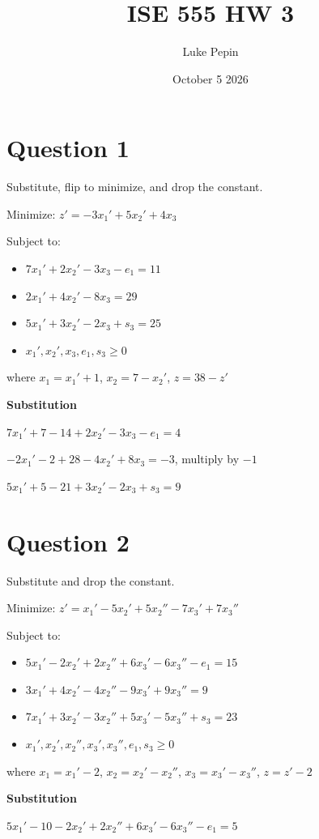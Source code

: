 \documentclass{article}
\title{ISE 555 HW 3}
\author{Luke Pepin}
\date{October 5 2026}
\begin{document}
\maketitle

\section*{Question 1}
Substitute, flip to minimize, and drop the constant.

Minimize: $z' = -3x_1' + 5x_2' + 4x_3$

Subject to:
\begin{itemize}
    \item $7x_1' + 2x_2' - 3x_3 - e_1 = 11$
    \item $2x_1' + 4x_2' - 8x_3 = 29$
    \item $5x_1' + 3x_2' - 2x_3 + s_3 = 25$
    \item $x_1', x_2', x_3, e_1, s_3 \ge 0$
\end{itemize}

where $x_1 = x_1' + 1$, $x_2 = 7 - x_2'$, $z = 38 - z'$

\textbf{Substitution}

$7x_1' + 7 - 14 + 2x_2' - 3x_3 - e_1 = 4$

$-2x_1' - 2 + 28 - 4x_2' + 8x_3 = -3$, multiply by $-1$

$5x_1' + 5 - 21 + 3x_2' - 2x_3 + s_3 = 9$

\section*{Question 2}
Substitute and drop the constant.

Minimize: $z' = x_1' - 5x_2' + 5x_2'' - 7x_3' + 7x_3''$

Subject to:
\begin{itemize}
    \item $5x_1' - 2x_2' + 2x_2'' + 6x_3' - 6x_3'' - e_1 = 15$
    \item $3x_1' + 4x_2' - 4x_2'' - 9x_3' + 9x_3'' = 9$
    \item $7x_1' + 3x_2' - 3x_2'' + 5x_3' - 5x_3'' + s_3 = 23$
    \item $x_1', x_2', x_2'', x_3', x_3'', e_1, s_3 \ge 0$
\end{itemize}

where $x_1 = x_1' - 2$, $x_2 = x_2' - x_2''$, $x_3 = x_3' - x_3''$, $z = z' - 2$

\textbf{Substitution}

$5x_1' - 10 - 2x_2' + 2x_2'' + 6x_3' - 6x_3'' - e_1 = 5$
\end{document}
